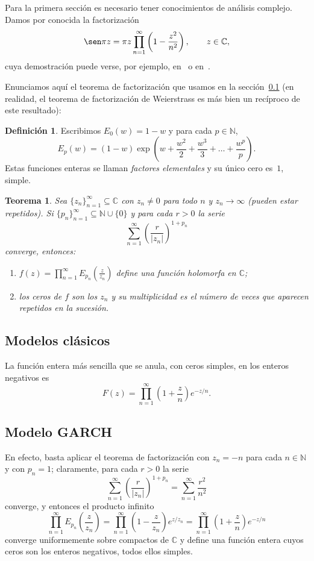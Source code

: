 \documentclass[11pt]{book}
\theoremstyle{plain} %
\newtheorem{teorema}{Teorema}[chapter]
\theoremstyle{definition} %
\newtheorem*{defin}{Definición} %
\newcommand\N{\mathbb{N}}
\newcommand\C{\mathbb{C}}
\begin{document}
Para la primera sección es necesario tener conocimientos de análisis complejo. 
Damos por conocida la factorización
\begin{equation}
\label{factor-seno}
   \sen \pi z = \pi z \prod_{n=1}^\infty \left(1 - \frac{z^2}{n^2} \right),
   \qquad z \in \C,
\end{equation}
cuya demostración puede verse, por ejemplo, en~\cite[pág.~518]{BC} o 
en~\cite[pág.~211--212]{W}.

Enunciamos aquí el teorema de factorización que 
usamos en la sección~\ref{Gamma-producto} (en realidad, el teorema de 
factorización de Weierstrass es más bien un recíproco de este resultado):
\begin{defin}
Escribimos $E_0(w) = 1 - w$ y para cada $p \in \N$,
\[
   E_p(w) 
   = (1-w) \exp\left(w + \frac{w^2}{2} + \frac{w^3}{3} + \dots + \frac{w^p}{p}\right).
\]
Estas funciones enteras se llaman \emph{factores elementales} y su único cero 
es~$1$, simple.
\end{defin}

\begin{teorema}
Sea $\{z_n\}_{n=1}^\infty \subseteq \C$ con $z_n \not= 0$ para todo $n$ y $z_n 
\to \infty$ (pueden estar repetidos). Si $\{p_n\}_{n=1}^\infty \subseteq \N \cup 
\{0\}$ y para cada $r > 0$ la serie
\[
   \sum_{n=1}^\infty \left(\frac{r}{|z_n|}\right)^{1+p_n}
\]
converge, entonces:
\begin{enumerate}
\item[a)] $f(z) = \prod\limits_{n=1}^\infty E_{p_n}(\frac{z}{z_n})$ define una 
función holomorfa en $\C$;
\item[b)] los ceros de $f$ son los $z_n$ y su multiplicidad es el número de veces 
que aparecen repetidos en la sucesión.
\end{enumerate}
\end{teorema}

\subsection{Modelos clásicos}
\label{Gamma-producto}

La función entera más sencilla que se anula, con ceros 
simples, en los enteros negativos es
\begin{equation}
\label{defF}
   F(z) = \prod_{n=1}^\infty \left(1 + \frac{z}{n}\right) e^{-z/n}.
\end{equation}
\subsection{Modelo GARCH}
En efecto, basta aplicar el teorema de 
factorización con $z_n = -n$ para cada $n \in \N$ 
y con $p_n = 1$; claramente, para cada $r > 0$ la serie
\[
   \sum_{n=1}^\infty \left( \frac{r}{|z_n|} \right)^{1+p_n}
   = \sum_{n=1}^\infty \frac{r^2}{n^2}
\]
converge, y entonces el producto infinito
\[
   \prod_{n=1}^\infty E_{p_n}\left(\frac{z}{z_n}\right)
   = \prod_{n=1}^\infty \left(1 - \frac{z}{z_n}\right) e^{z/z_n}
   = \prod_{n=1}^\infty \left(1 + \frac{z}{n}\right) e^{-z/n}
\]
converge uniformemente sobre 
compactos de $\C$ y define una 
función entera cuyos ceros son los enteros negativos, todos ellos simples.
\end{document}
